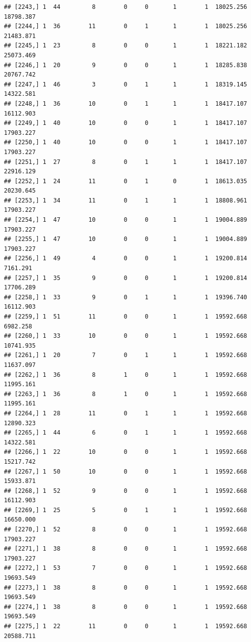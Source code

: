 \documentclass[
]{article}
\begin{document}
\begin{verbatim}
## [2243,] 1  44         8        0     0       1        1  18025.256  18798.387
## [2244,] 1  36        11        0     1       1        1  18025.256  21483.871
## [2245,] 1  23         8        0     0       1        1  18221.182  25073.469
## [2246,] 1  20         9        0     0       1        1  18285.838  20767.742
## [2247,] 1  46         3        0     1       1        1  18319.145  14322.581
## [2248,] 1  36        10        0     1       1        1  18417.107  16112.903
## [2249,] 1  40        10        0     0       1        1  18417.107  17903.227
## [2250,] 1  40        10        0     0       1        1  18417.107  17903.227
## [2251,] 1  27         8        0     1       1        1  18417.107  22916.129
## [2252,] 1  24        11        0     1       0        1  18613.035  20230.645
## [2253,] 1  34        11        0     1       1        1  18808.961  17903.227
## [2254,] 1  47        10        0     0       1        1  19004.889  17903.227
## [2255,] 1  47        10        0     0       1        1  19004.889  17903.227
## [2256,] 1  49         4        0     0       1        1  19200.814   7161.291
## [2257,] 1  35         9        0     0       1        1  19200.814  17706.289
## [2258,] 1  33         9        0     1       1        1  19396.740  16112.903
## [2259,] 1  51        11        0     0       1        1  19592.668   6982.258
## [2260,] 1  33        10        0     0       1        1  19592.668  10741.935
## [2261,] 1  20         7        0     1       1        1  19592.668  11637.097
## [2262,] 1  36         8        1     0       1        1  19592.668  11995.161
## [2263,] 1  36         8        1     0       1        1  19592.668  11995.161
## [2264,] 1  28        11        0     1       1        1  19592.668  12890.323
## [2265,] 1  44         6        0     1       1        1  19592.668  14322.581
## [2266,] 1  22        10        0     0       1        1  19592.668  15217.742
## [2267,] 1  50        10        0     0       1        1  19592.668  15933.871
## [2268,] 1  52         9        0     0       1        1  19592.668  16112.903
## [2269,] 1  25         5        0     1       1        1  19592.668  16650.000
## [2270,] 1  52         8        0     0       1        1  19592.668  17903.227
## [2271,] 1  38         8        0     0       1        1  19592.668  17903.227
## [2272,] 1  53         7        0     0       1        1  19592.668  19693.549
## [2273,] 1  38         8        0     0       1        1  19592.668  19693.549
## [2274,] 1  38         8        0     0       1        1  19592.668  19693.549
## [2275,] 1  22        11        0     0       1        1  19592.668  20588.711

\end{verbatim}
\end{document}

